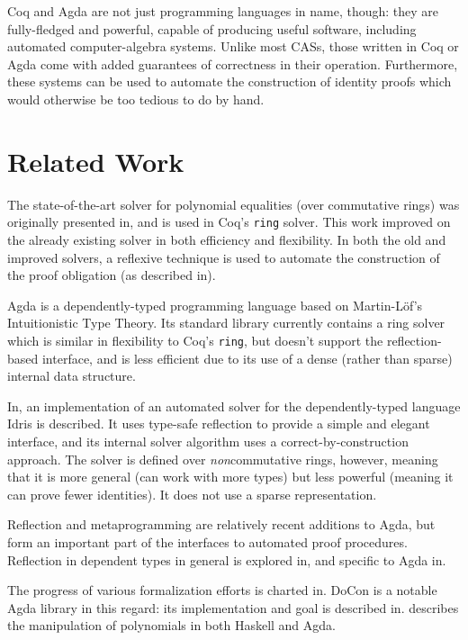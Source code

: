 \documentclass[draft, twocolumn]{article}
\theoremstyle{definition}
\theoremstyle{remark}
\begin{document}
Coq and Agda are not just programming languages in name, though: they are
fully-fledged and powerful, capable of producing useful software, including
automated computer-algebra systems. Unlike most CASs, those written in Coq or
Agda come with added guarantees of correctness in their operation. Furthermore,
these systems can be used to automate the construction of identity proofs which
would otherwise be too tedious to do by hand.
\section{Related Work}
The state-of-the-art solver for polynomial equalities (over commutative rings)
was originally presented in\cite{gregoire_proving_2005}, and is used in Coq's
\verb+ring+ solver. This work improved on the already existing
solver\cite{Coq:manual} in both efficiency and flexibility. In both the old and
improved solvers, a reflexive technique is used to automate the construction of
the proof obligation (as described in\cite{boutin_using_1997}).

Agda\cite{norell_dependently_2008} is a dependently-typed programming language
based on Martin-Löf's Intuitionistic Type
Theory\cite{martin-lof_intuitionistic_1980}. Its standard
library\cite{danielsson_agda_2018} currently contains a ring solver which is
similar in flexibility to Coq's \verb+ring+, but doesn't support the
reflection-based interface, and is less efficient due to its use of a dense
(rather than sparse) internal data structure.

In\cite{geuvers_automatically_2017}, an implementation of an automated solver
for the dependently-typed language Idris\cite{brady_idris_2013} is described. It
uses type-safe reflection to provide a simple and elegant interface, and its
internal solver algorithm uses a correct-by-construction approach. The solver is
defined over \emph{non}commutative rings, however, meaning that it is more
general (can work with more types) but less powerful (meaning it can prove fewer
identities). It does not use a sparse representation.

Reflection and metaprogramming are relatively recent additions to Agda, but form
an important part of the interfaces to automated proof procedures. Reflection in
dependent types in general is explored in\cite{christiansen_practical_2015}, and
specific to Agda in\cite{van_der_walt_reflection_2012}.

The progress of various formalization efforts is charted
in\cite{wiedijk_formalizing_2018}. DoCon\cite{meshveliani_docon-provable_2018}
is a notable Agda library in this regard: its implementation and goal is
described in\cite{meshveliani_dependent_2013}. \cite{cheng_functional_2018}
describes the manipulation of polynomials in both Haskell and Agda.
\end{document}
